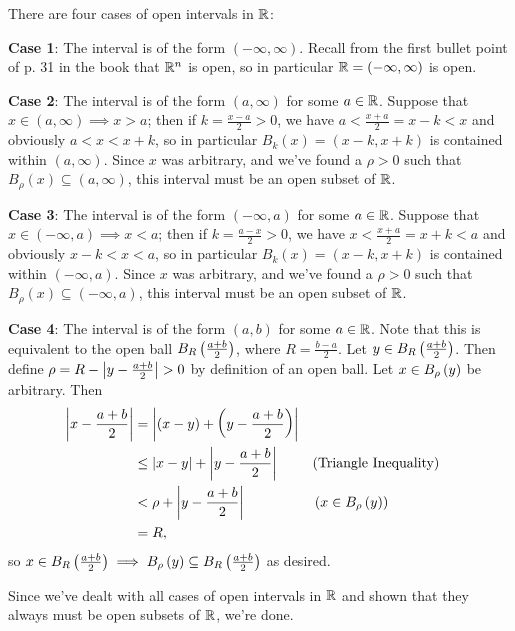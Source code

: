 \documentclass[main.tex]{subfiles}
\begin{document}
\begin{soln}
    There are four cases of open intervals in $\mathbb R$:
    
    \textbf{Case 1}: The interval is of the form $(-\infty, \infty)$. Recall from the first bullet point of p. 31 in the book that $\mathbb R^n$ is open, so in particular $\mathbb R = (-\infty, \infty)$ is open.

    \textbf{Case 2}: The interval is of the form $(a, \infty)$ for some $a\in \mathbb R$. Suppose that $x\in (a, \infty)\implies x > a$; then if $k = \frac{x - a}{2} > 0$, we have $a < \frac{x + a}{2} = x - k < x$ and obviously $a < x < x + k$, so in particular $B_{k}(x) = (x - k, x + k)$ is contained within $(a, \infty)$. Since $x$ was arbitrary, and we've found a $\rho > 0$ such that $B_\rho(x)\subseteq (a, \infty)$, this interval must be an open subset of $\mathbb R$.

    \textbf{Case 3}: The interval is of the form $(-\infty, a)$ for some $a\in \mathbb R$. Suppose that $x\in (-\infty, a)\implies x < a$; then if $k = \frac{a - x}{2} > 0$, we have $x < \frac{x + a}{2} = x + k < a$ and obviously $x - k < x < a$, so in particular $B_{k}(x) = (x - k, x + k)$ is contained within $(-\infty, a)$. Since $x$ was arbitrary, and we've found a $\rho > 0$ such that $B_\rho(x)\subseteq (-\infty, a)$, this interval must be an open subset of $\mathbb R$.

    \textbf{Case 4}: The interval is of the form $(a, b)$ for some $a\in \mathbb R$. Note that this is equivalent to the open ball $B_R\left( \frac{a + b}{2} \right)$, where $R = \frac{b - a}{2}$. Let $y\in B_R\left( \frac{a + b}{2} \right)$. Then define $\rho = R - \left\lvert y - \frac{a + b}{2} \right\rvert > 0$ by definition of an open ball. Let $x\in B_\rho\left( y \right)$ be arbitrary. Then
    \begin{align*}
        \left\lvert x - \frac{a + b}{2} \right\rvert &= \left\lvert (x - y) + \left( y - \frac{a + b}{2} \right) \right\rvert \\
        &\le \left\lvert x - y \right\rvert + \left\lvert y - \frac{a + b}{2} \right\rvert && \text{(Triangle Inequality)}\\
        &< \rho + \left\lvert y - \frac{a + b}{2} \right\rvert && \left( x\in B_\rho\left( y \right) \right) \\
        &= R,
    \end{align*}
    so $x \in B_R\left( \frac{a + b}{2} \right)\implies B_\rho\left( y \right)\subseteq B_R\left( \frac{a + b}{2} \right)$ as desired.

    Since we've dealt with all cases of open intervals in $\mathbb R$ and shown that they always must be open subsets of $\mathbb R$, we're done.
\end{soln}
\eject
\end{document}

